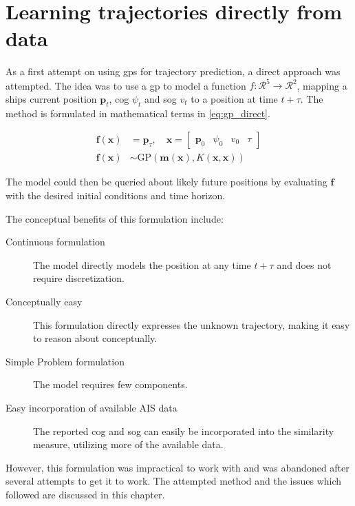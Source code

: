 \chapter{Learning trajectories directly from data}
As a first attempt on using \acrshort{gp}s for trajectory prediction, a direct approach was attempted. The idea was to use a \acrshort{gp} to model a function $f: \mathcal{R}^5 \to \mathcal{R}^2$, mapping a ships current position $\boldsymbol{p}_t$, \acrshort{cog} $\psi_t$ and \acrshort{sog} $v_t$ to a position at time $t+\tau$. The method is formulated in mathematical terms in \cref{eq:gp_direct}. 

\begin{subequations}\label{eq:gp_direct}
\begin{align}
    \boldsymbol{f}(\boldsymbol{x}) &= \boldsymbol{p}_{\tau} \label{eq:gp_direct_f}, \quad \boldsymbol{x} = \begin{bmatrix} \boldsymbol{p}_0 & \psi_0 & v_0 & \tau\end{bmatrix}\\
    \boldsymbol{f}(\boldsymbol{x}) &\sim \text{GP}(\boldsymbol{m}(\boldsymbol{x}), K(\boldsymbol{x}, \boldsymbol{x}))\label{eq:gp_direct_f_dist}
\end{align} 
\end{subequations}

The model could then be queried about likely future positions by evaluating $\boldsymbol{f}$ with the desired initial conditions and time horizon. 

The conceptual benefits of this formulation include:
\begin{description}
    \item[Continuous formulation] The model directly models the position at any time $t+\tau$ and does not require discretization. 
    \item[Conceptually easy] This formulation directly expresses the unknown trajectory, making it easy to reason about conceptually.
    \item[Simple Problem formulation] The model requires few components.
    \item[Easy incorporation of available AIS data] The reported \acrshort{cog} and \acrshort{sog} can easily be incorporated into the similarity measure, utilizing more of the available data.
\end{description}

However, this formulation was impractical to work with and was abandoned after several attempts to get it to work. The attempted method and the issues which followed are discussed in this chapter.


